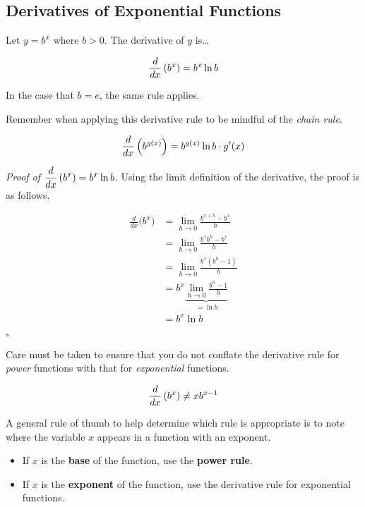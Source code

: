 \documentclass[12pt]{article}
\begin{document}
\subsection*{Derivatives of Exponential Functions}

Let $y=b^x$ where $b>0$. The derivative of $y$ is\dots

$$\frac{d}{dx}\left( b^x\right)=b^x\ln b$$

\vspace{3mm}

In the case that $b=e$, the same rule applies.

\newpage

Remember when applying this derivative rule to be mindful of the \textit{chain rule}.

$$\frac{d}{dx}\left( b^{g(x)}\right)=b^{g(x)}\ln b\cdot g'(x)$$

\vspace{3mm}

\textit{Proof of $\displaystyle\frac{d}{dx}\left( b^x\right)=b^x\ln b$.} Using the limit definition of the derivative, the proof is as follows.

\begin{align*}
	\frac{d}{dx}\big(b^x\big) &= \lim_{h\to 0}\frac{b^{x+h}-b^x}{h} \\ 
				      &= \lim_{h\to 0}\frac{b^xb^h - b^x}{h} \\ 
				      &= \lim_{h\to 0}\frac{b^x(b^h - 1)}{h} \\ 
				      &= b^x\underbrace{\lim_{h\to 0}\frac{b^h - 1}{h}}_{=\ln b} \\ 
				      &= b^x\ln b
\end{align*}
\begin{flushright}
	$\square$
\end{flushright}


Care must be taken to ensure that you do not conflate the derivative rule for \textit{power} functions with that for \textit{exponential} functions.

$$\frac{d}{dx}\left( b^x\right) \neq xb^{x-1}$$

\vspace{5mm}

A general rule of thumb to help determine which rule is appropriate is to note where the variable $x$ appears in a function with an exponent.
\begin{itemize}
	\item If $x$ is the \textbf{base} of the function, use the \textbf{power rule}.
	
	\vspace{15mm}
	
	\item If $x$ is the \textbf{exponent} of the function, use the derivative rule for exponential functions.
	
	\vspace{15mm}
	
\end{itemize}
\end{document}
